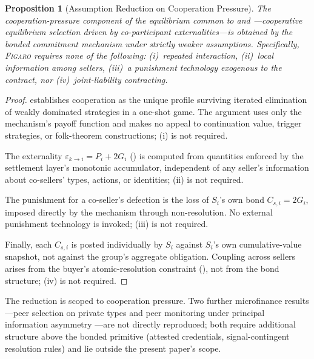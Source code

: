 \documentclass[11pt,a4paper]{article}
\newtheorem{proposition}[theorem]{Proposition}
\theoremstyle{definition}
\theoremstyle{remark}
\newcommand{\figaro}{\textsc{Figaro}}
\newcommand{\pay}{P}           %
\newcommand{\cumval}{G}        %
\begin{document}
\begin{proposition}[Assumption Reduction on Cooperation Pressure]
\label{prop:microfinance-reduction}
The \emph{cooperation-pressure component} of the equilibrium common
to \citet{ghatak1999} and \citet{stiglitz1990}---cooperative
equilibrium selection driven by co-participant externalities---is
obtained by the bonded commitment mechanism under strictly weaker
assumptions. Specifically, \figaro{} requires none of the following:
(i)~repeated interaction,
(ii)~local information among sellers,
(iii)~a punishment technology exogenous to the contract, nor
(iv)~joint-liability contracting.
\end{proposition}

\begin{proof}
 establishes cooperation as the unique profile
surviving iterated elimination of weakly dominated strategies in a
one-shot game. The argument uses only the mechanism's payoff function
and makes no appeal to continuation value, trigger strategies, or
folk-theorem constructions; (i) is not required.

The externality $\varepsilon_{k \to i} = \pay_i + 2\cumval_i$
() is computed from quantities
enforced by the settlement layer's monotonic accumulator, independent
of any seller's information about co-sellers' types, actions, or
identities; (ii) is not required.

The punishment for a co-seller's defection is the loss of $S_i$'s own
bond $C_{s,i} = 2\cumval_i$, imposed directly by the mechanism through
non-resolution. No external punishment technology is invoked;
(iii) is not required.

Finally, each $C_{s,i}$ is posted individually by $S_i$ against
$S_i$'s own cumulative-value snapshot, not against the group's
aggregate obligation. Coupling across sellers arises from the buyer's
atomic-resolution constraint (), not from
the bond structure; (iv) is not required.
\end{proof}

The reduction is scoped to cooperation pressure. Two further
microfinance results---peer selection on private types
\citep{ghatak1999} and peer monitoring under principal information
asymmetry \citep{stiglitz1990}---are not directly reproduced; both
require additional structure above the bonded primitive (attested
credentials, signal-contingent resolution rules) and lie outside
the present paper's scope.
\end{document}
